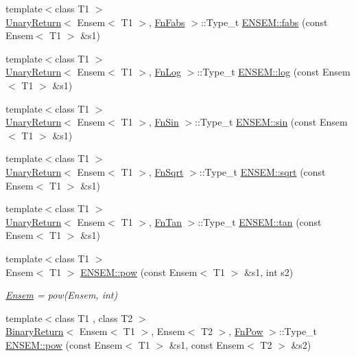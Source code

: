 \begin{DoxyCompactItemize}
\item 
{\footnotesize template$<$class T1 $>$ }\\\mbox{\hyperlink{structUnaryReturn}{Unary\+Return}}$<$ Ensem$<$ T1 $>$, \mbox{\hyperlink{structFnFabs}{Fn\+Fabs}} $>$\+::Type\+\_\+t \mbox{\hyperlink{group__eensem_ga6639ef2f6996bfe1d8daa6ba09d52acb}{E\+N\+S\+E\+M\+::fabs}} (const Ensem$<$ T1 $>$ \&s1)
\item 
{\footnotesize template$<$class T1 $>$ }\\\mbox{\hyperlink{structUnaryReturn}{Unary\+Return}}$<$ Ensem$<$ T1 $>$, \mbox{\hyperlink{structFnLog}{Fn\+Log}} $>$\+::Type\+\_\+t \mbox{\hyperlink{group__eensem_gade72fe6a4a31fa197d470c2ea6ce63a8}{E\+N\+S\+E\+M\+::log}} (const Ensem$<$ T1 $>$ \&s1)
\item 
{\footnotesize template$<$class T1 $>$ }\\\mbox{\hyperlink{structUnaryReturn}{Unary\+Return}}$<$ Ensem$<$ T1 $>$, \mbox{\hyperlink{structFnSin}{Fn\+Sin}} $>$\+::Type\+\_\+t \mbox{\hyperlink{group__eensem_ga7c76c7e409f4cb0cb13cdb648ac99814}{E\+N\+S\+E\+M\+::sin}} (const Ensem$<$ T1 $>$ \&s1)
\item 
{\footnotesize template$<$class T1 $>$ }\\\mbox{\hyperlink{structUnaryReturn}{Unary\+Return}}$<$ Ensem$<$ T1 $>$, \mbox{\hyperlink{structFnSqrt}{Fn\+Sqrt}} $>$\+::Type\+\_\+t \mbox{\hyperlink{group__eensem_gac8bfa621e2dd6c732c311e9ffafb6eaf}{E\+N\+S\+E\+M\+::sqrt}} (const Ensem$<$ T1 $>$ \&s1)
\item 
{\footnotesize template$<$class T1 $>$ }\\\mbox{\hyperlink{structUnaryReturn}{Unary\+Return}}$<$ Ensem$<$ T1 $>$, \mbox{\hyperlink{structFnTan}{Fn\+Tan}} $>$\+::Type\+\_\+t \mbox{\hyperlink{group__eensem_ga56d3def0223da8c49dd2210228349eb0}{E\+N\+S\+E\+M\+::tan}} (const Ensem$<$ T1 $>$ \&s1)
\item 
{\footnotesize template$<$class T1 $>$ }\\Ensem$<$ T1 $>$ \mbox{\hyperlink{group__eensem_ga038873ee1f1a6dfb9540558711f11110}{E\+N\+S\+E\+M\+::pow}} (const Ensem$<$ T1 $>$ \&s1, int s2)
\begin{DoxyCompactList}\small\item\em \mbox{\hyperlink{classENSEM_1_1Ensem}{Ensem}} = pow(\+Ensem, int) \end{DoxyCompactList}\item 
{\footnotesize template$<$class T1 , class T2 $>$ }\\\mbox{\hyperlink{structBinaryReturn}{Binary\+Return}}$<$ Ensem$<$ T1 $>$, Ensem$<$ T2 $>$, \mbox{\hyperlink{structFnPow}{Fn\+Pow}} $>$\+::Type\+\_\+t \mbox{\hyperlink{group__eensem_ga08a0a61df39df2d4038eed616fcfa56b}{E\+N\+S\+E\+M\+::pow}} (const Ensem$<$ T1 $>$ \&s1, const Ensem$<$ T2 $>$ \&s2)

\end{DoxyCompactItemize}
